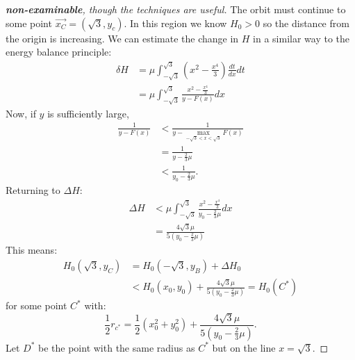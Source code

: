 \documentclass[../Main.tex]{subfiles}
\begin{document}
\begin{proof}[\textbf{non-examinable}, though the techniques are useful]
    The orbit must continue to some point $\vec{x_C} = (\sqrt{3}, y_c)$. In this region we know $H_0 > 0$ so the distance from the origin is increasing. We can estimate the change in $H$ in a similar way to the energy balance principle:
    \begin{align*}
        \delta H &= \mu \int_{-\sqrt{3}}^{\sqrt{3}} \left(x^2 - \frac{x^4}{3}\right) \frac{dt}{dx} dt \\
        &= \mu \int_{-\sqrt{3}}^{\sqrt{3}} \frac{x^2 - \frac{x^4}{3}}{y - F(x)} dx 
    \end{align*}
    Now, if $y$ is sufficiently large,
    \begin{align*}
        \frac{1}{y - F(x)} &< \frac{1}{y - \max_{-\sqrt{3} < x < \sqrt{3}} F(x)} \\
        &= \frac{1}{y - \frac23 \mu} \\
        &< \frac{1}{y_0 - \frac23 \mu}.
    \end{align*}
    Returning to $\Delta H$:
    \begin{align*}
        \Delta H &< \mu \int_{-\sqrt{3}}^{\sqrt{3}} \frac{x^2 - \frac{x^4}{3}}{y_0 - \frac23 \mu} dx \\
        &= \frac{4\sqrt{3} \mu}{5 \left(y_0 - \frac23 \mu\right)}
    \end{align*}
    This means:
    \begin{align*}
        H_0(\sqrt{3}, y_C) &= H_0(-\sqrt{3}, y_B) + \Delta H_0 \\
        &< H_0 (x_0, y_0) + \frac{4\sqrt{3} \mu}{5 \left(y_0 - \frac23 \mu\right)} = H_0(C^*)
    \end{align*}
    for some point $C^*$ with:
    \begin{equation*}
        \frac12 r_{c^*} = \frac12 \left(x_0^2 + y_0^2\right) + \frac{4\sqrt{3} \mu}{5 \left(y_0 - \frac23 \mu\right)}.
    \end{equation*}
    Let $D^*$ be the point with the same radius as $C^*$ but on the line $x = \sqrt{3}$. %
\end{proof}
\end{document}
